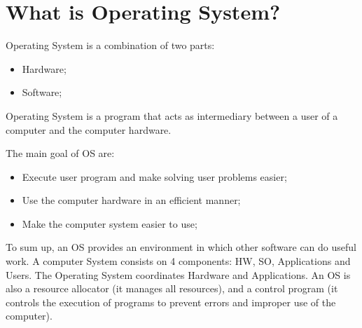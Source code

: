 \chapter{What is Operating System?}

Operating System is a combination of two parts:

\begin{itemize}
    \item Hardware;
    \item Software;
\end{itemize}

Operating System is a program that acts as intermediary between a user of a computer and the computer hardware.

The main goal of OS are:

\begin{itemize}
    \item Execute user program and make solving user problems easier;
    \item Use the computer hardware in an efficient manner;
    \item Make the computer system easier to use;
\end{itemize}

To sum up, an OS provides an environment in which other software can do
useful work.
A computer System consists on 4 components: HW, SO, Applications and
Users.
The Operating System coordinates Hardware and Applications.
An OS is also a resource allocator (it manages all resources), and a control program (it controls
the execution of programs to prevent errors and improper use of the computer).

